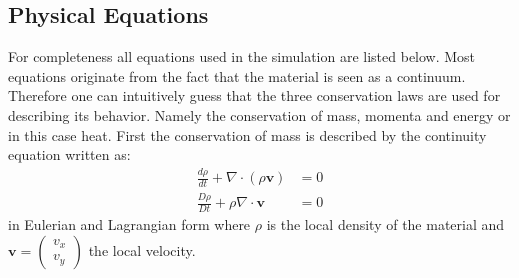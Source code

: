 \documentclass[12pt]{scrreprt}
\begin{document}
\subsection{Physical Equations}
For completeness all equations used in the simulation are listed below. Most equations originate from the fact that the material is seen as a continuum. Therefore one can intuitively guess that the three conservation laws are used for describing its behavior. Namely the conservation of mass, momenta and energy or in this case heat. First the conservation of mass is described by the continuity equation written as:
\begin{align}
\frac{d \rho}{d t} + \nabla \cdot (\rho \mathbf{v})&=0\\
\frac{D \rho}{D t} + \rho \nabla \cdot \mathbf{v}&=0
\end{align}
in Eulerian and Lagrangian form where $\rho$ is the local density of the material and $\mathbf{v}=\begin{pmatrix}v_x\\v_y \end{pmatrix}$ the local velocity.
\end{document}
